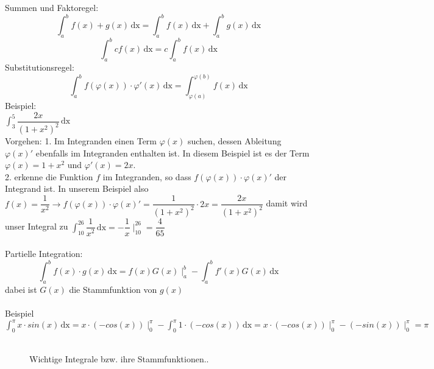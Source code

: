 \documentclass[12pt]{article}
\begin{document}
Summen und Faktoregel:
\begin{equation}
\int_{a}^b f(x) + g(x)\, \mathrm{dx} = \int_{a}^b f(x)\, \mathrm{dx} + \int_{a}^b g(x)\, \mathrm{dx}
\end{equation}
\begin{equation}
\int_{a}^b cf(x)\, \mathrm{dx} = c \int_{a}^b f(x)\, \mathrm{dx}
\end{equation}
Substitutionsregel:
\begin{equation}
\int_{a}^b f( \varphi (x)) \cdot \varphi'(x) \, \mathrm{dx} = \int_{\varphi(a)}^{\varphi(b)} f(x)\, \mathrm{dx}
\end{equation}
Beispiel:\\
$\int_{3}^5 \dfrac{2x}{(1+x^2)^2}\, \mathrm{dx}$\\
Vorgehen: 1. Im Integranden einen Term $\varphi(x)$ suchen, dessen Ableitung $\varphi(x)'$ ebenfalls im Integranden enthalten ist. In diesem Beispiel ist es der Term $\varphi(x) = 1+x^2$ und $\varphi'(x) = 2x$.\\
2. erkenne die Funktion $f$ im Integranden, so dass $f(\varphi(x)) \cdot \varphi(x)'$ der Integrand ist. In unserem Beispiel also $f(x) = \dfrac{1}{x^2} \rightarrow f(\varphi(x)) \cdot \varphi(x)' = \dfrac{1}{(1+x^2)^2} \cdot 2x = \dfrac{2x}{(1+x^2)^2}$ damit wird unser Integral zu $\int_{10}^{26} \dfrac{1}{x^2}\, \mathrm{dx} = -\dfrac{1}{x} \mid_{10}^{26} = \dfrac{4}{65}$\\
\\
Partielle Integration:
\begin{equation}
\int_{a}^b f(x) \cdot g(x)\, \mathrm{dx} = f(x)G(x) \mid_a^b - \int_{a}^b f'(x)G(x)\, \mathrm{dx}
\end{equation}
dabei ist $G(x)$ die Stammfunktion von $g(x)$\\
\\ Beispiel\\
$\int_{0}^{\pi} x \cdot sin(x)\, \mathrm{dx} = x \cdot (-cos(x)) \mid_0^{\pi} - \int_{0}^{\pi} 1 \cdot (-cos(x))\, \mathrm{dx} = x \cdot (-cos(x)) \mid_0^{\pi} - (-sin(x)) \mid_0^{\pi} = \pi$\\
\\
\begin{figure}[H]
  \caption{Wichtige Integrale bzw. ihre Stammfunktionen..}
  \label{fig:1teil}
\end{figure} 
\end{document}

